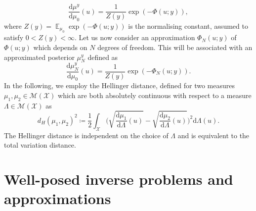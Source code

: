\documentclass{article}
\theoremstyle{remark}
\theoremstyle{definition}
\newcommand{\E}{\operatorname{\mathbb{E}}}
\newcommand{\dd}{\mathrm{d}}
\newcommand{\ml}{\mathcal}
\begin{document}
\begin{equation}\label{eq:InverseProblem}
	\frac{\dd \mu^y }{\dd \mu_0} (u) = \frac{1}{Z(y)} \exp (-\Phi(u; y)),
\end{equation}
where $Z(y) = \E_{\mu_0} \exp(-\Phi(u; y))$ is the normalising constant, assumed to satisfy $0 < Z(y) < \infty$. Let us now consider an approximation $\Phi_N(u; y)$ of $\Phi(u; y)$ which depends on $N$ degrees of freedom. This will be associated with an approximated posterior $\mu_N^y$ defined as
\begin{equation}\label{eq:ApproxInverseProblem}
	\frac{\dd \mu_N^y }{\dd \mu_0} (u) = \frac{1}{Z(y)} \exp (-\Phi_N(u; y)).
\end{equation}
In the following, we employ the Hellinger distance, defined for two measures $\mu_1, \mu_2 \in \ml M(\ml X)$ which are both absolutely continuous with respect to a measure $\Lambda \in \ml M(\ml X)$ as
\begin{equation*}
	d_H(\mu_1, \mu_2)^2 \coloneqq \frac{1}{2} \int_{\ml X} \Big(\sqrt{\frac{\dd \mu_1}{\dd \Lambda}(u)} - \sqrt{\frac{\dd \mu_2}{\dd \Lambda}(u)} \Big)^2 \dd \Lambda(u).
\end{equation*}
The Hellinger distance is independent on the choice of $\Lambda$ and is equivalent to the total variation distance.

\section*{Well-posed inverse problems and approximations}
\end{document}
